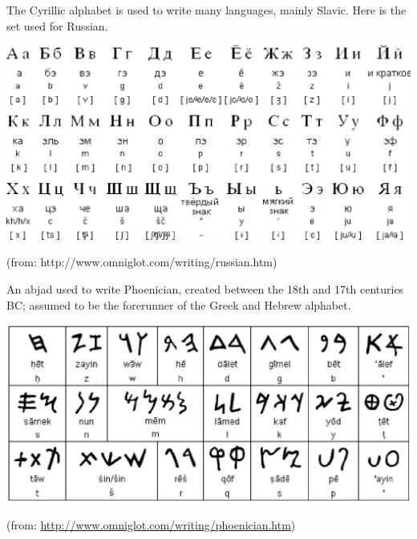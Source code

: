\documentclass[a4paper,landscape,headrule,footrule,xetex]{foils}
\begin{document}

The Cyrillic alphabet is used to write many languages, mainly Slavic.
Here is the set used for Russian.

\includegraphics{../pics/russian.eps}




(from: http://www.omniglot.com/writing/russian.htm)



An abjad used to write Phoenician, created between the 18th and 17th
centuries BC; assumed to be the forerunner of the Greek and Hebrew
alphabet.




\includegraphics{../pics/phonecian.eps}



(from: \url{http://www.omniglot.com/writing/phoenician.htm})
\end{document}
